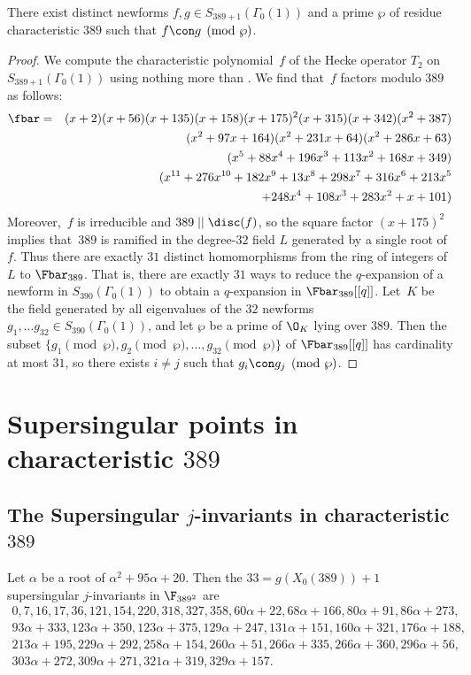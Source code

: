 \documentclass{report}
\begin{document}
\begin{proposition}
There exist distinct newforms $f, g\in S_{389+1}(\Gamma_0(1))$
and a prime $\wp$ of residue characteristic $389$ such that
$f\con g \pmod{\wp}$.
\end{proposition}
\begin{proof}
We compute the characteristic polynomial~$f$ of the Hecke operator $T_2$
on $S_{389+1}(\Gamma_0(1))$ using nothing
more than \cite[Ch.~VII]{serre:arithmetic}.
We find that~$f$ factors modulo $389$ as follows:
\begin{eqnarray*}
\fbar&=&(x + 2)(x + 56)(x + 135)(x + 158)(x + 175)^2(x + 315)(x + 342)(x^2 + 387)\\
&&(x^2 + 97x + 164)(x^2 + 231x + 64)(x^2 + 286x + 63)\\
&&(x^5 + 88x^4 + 196x^3 + 113x^2 + 168x + 349)\\
&&(x^{11} + 276x^{10} + 182x^9 + 13x^8 + 298x^7 + 316x^6 + 213x^5 \\
&&\qquad+ 248x^4 + 108x^3 + 283x^2 + x + 101)
\end{eqnarray*}
Moreover,~$f$ is irreducible and $389\mid\mid \disc(f)$, so
the square factor $(x+175)^2$ implies that~$389$
is ramified in the degree-$32$ field $L$ generated by a single root of $f$.
Thus there are exactly $31$ distinct homomorphisms from the ring of integers of $L$ to
$\Fbar_{389}$.  That is, there are exactly $31$ ways to reduce the $q$-expansion of a
newform in $S_{390}(\Gamma_0(1))$ to obtain a
$q$-expansion in $\Fbar_{389}[[q]]$.
Let~$K$ be the field generated by all eigenvalues of the $32$
newforms $g_1, \ldots g_{32} \in S_{390}(\Gamma_0(1))$, and let $\wp$
be a prime of $\O_K$ lying over $389$.
Then the subset
$\{g_1 \pmod{\wp}, g_2 \pmod{\wp}, \ldots, g_{32}\pmod{\wp}\}$
of $\Fbar_{389}[[q]]$ has cardinality at most $31$, so
there exists $i \neq j$ such that
$g_i \con g_j \pmod{\wp}$.
\end{proof}


\section{Supersingular points in characteristic $389$}
\subsection{The Supersingular $j$-invariants in characteristic $389$}
Let $\alpha$ be a root of $\alpha^2+95\alpha+20$.  Then the
$33=g(X_0(389))+1$ supersingular $j$-invariants in $\F_{389^2}$ are
$$
\begin{array}{l}
0, 7, 16, 17, 36, 121, 154, 220, 318, 327, 358, 60\alpha + 22, 68\alpha + 166, 80\alpha + 91, 86\alpha + 273, \\
93\alpha + 333, 123\alpha + 350, 123\alpha + 375, 129\alpha + 247, 131\alpha + 151, 160\alpha + 321, 176\alpha + 188,\\
213\alpha + 195, 229\alpha + 292, 258\alpha + 154, 260\alpha + 51, 266\alpha + 335,  266\alpha + 360, 296\alpha + 56, \\
303\alpha + 272, 309\alpha + 271, 321\alpha + 319, 329\alpha + 157.
\end{array}
$$
\end{document}
